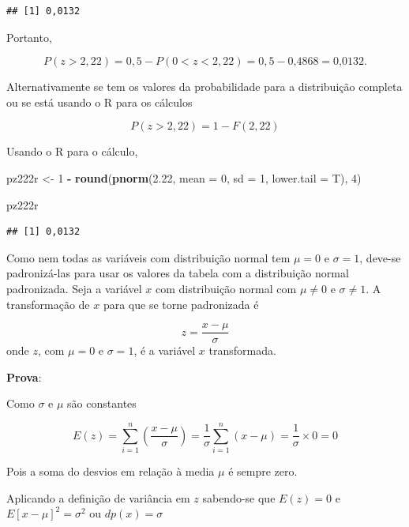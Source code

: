 \documentclass[
]{book}
\newenvironment{Shaded}{\begin{snugshade}}{\end{snugshade}}
\newcommand{\DataTypeTok}[1]{\textcolor[rgb]{0.13,0.29,0.53}{#1}}
\newcommand{\DecValTok}[1]{\textcolor[rgb]{0.00,0.00,0.81}{#1}}
\newcommand{\FloatTok}[1]{\textcolor[rgb]{0.00,0.00,0.81}{#1}}
\newcommand{\KeywordTok}[1]{\textcolor[rgb]{0.13,0.29,0.53}{\textbf{#1}}}
\newcommand{\NormalTok}[1]{#1}
\newcommand{\OperatorTok}[1]{\textcolor[rgb]{0.81,0.36,0.00}{\textbf{#1}}}
\newcommand{\StringTok}[1]{\textcolor[rgb]{0.31,0.60,0.02}{#1}}
\begin{document}
\begin{verbatim}
## [1] 0,0132
\end{verbatim}

Portanto,

\[
  P(z>2,22) = 0,5 - P(0 < z < 2,22) = 0,5 - \text{0,4868} = \text{0,0132}. 
\]

Alternativamente se tem os valores da probabilidade para a distribuição completa ou se está usando o R para os cálculos

\[
  P(z >2,22) = 1 - F(2,22)
\]

Usando o R para o cálculo,

\begin{Shaded}
\begin{Highlighting}[]
\NormalTok{pz222r <-}\StringTok{ }\DecValTok{1} \OperatorTok{-}\StringTok{ }\KeywordTok{round}\NormalTok{(}\KeywordTok{pnorm}\NormalTok{(}\FloatTok{2.22}\NormalTok{, }\DataTypeTok{mean =} \DecValTok{0}\NormalTok{, }\DataTypeTok{sd =} \DecValTok{1}\NormalTok{, }\DataTypeTok{lower.tail =}\NormalTok{ T), }
    \DecValTok{4}\NormalTok{)}

\NormalTok{pz222r}
\end{Highlighting}
\end{Shaded}

\begin{verbatim}
## [1] 0,0132
\end{verbatim}

Como nem todas as variáveis com distribuição normal tem \(\mu=0\) e \(\sigma = 1\), deve-se padronizá-las para usar os valores da tabela com a distribuição normal padronizada. Seja a variável \(x\) com distribuição normal com \(\mu\neq0\) e \(\sigma \neq 1\). A transformação de \(x\) para que se torne padronizada é

\[
  z = \dfrac{x - \mu}{\sigma}
  \label{eq:PadronizacaoNormal}
\]
onde \(z\), com \(\mu = 0\) e \(\sigma = 1\), é a variável \(x\) transformada.

\textbf{Prova}:

Como \(\sigma\) e \(\mu\) são constantes

\[
  E(z) = \sum_{i=1}^{n} \left(\dfrac{x - \mu}{\sigma}\right) =
  \dfrac{1}{\sigma}\sum_{i=1}^{n}(x - \mu) = \dfrac{1}{\sigma}\times 0 = 0
\]

Pois a soma do desvios em relação à media \(\mu\) é sempre zero.

Aplicando a definição de variância em \(z\) sabendo-se que \(E(z)=0\) e \(E[x-\mu]^2 = \sigma^2\) ou \(dp(x) = \sigma\)
\end{document}
